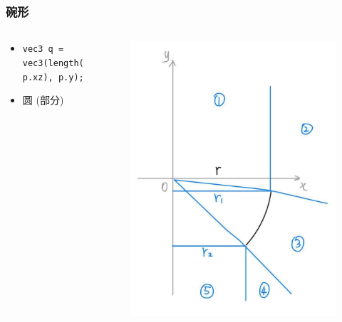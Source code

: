 \documentclass[aspectratio=169]{ctexbeamer} %
\begin{document}
\begin{frame}
    \frametitle{碗形} %
    \begin{columns}
        \begin{column}{.6\textwidth}
            \begin{itemize}
                \item \texttt{vec3 q = vec3(length(p.xz), p.y);}
                \item 圆 (部分)
            \end{itemize}
        \end{column}
        \begin{column}{.4\textwidth}
            \begin{figure}[htbp]
                \centering
                \includegraphics[height=.65\textheight]{images/pre/bowl_derive.pdf}
                \caption{}
                \label{fig:bowl_derive}
            \end{figure}
        \end{column}
    \end{columns}
\end{frame}
\end{document}
